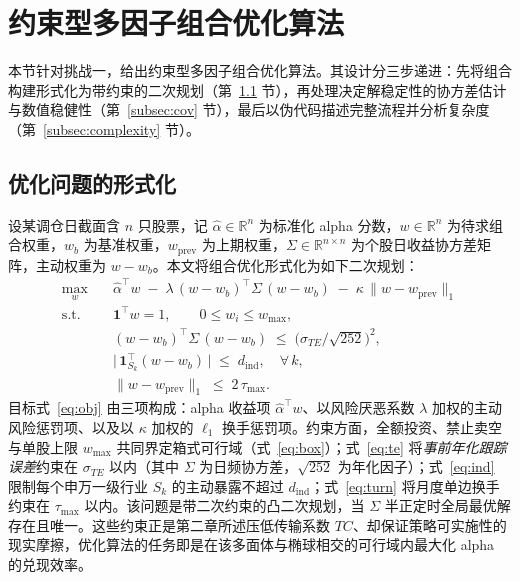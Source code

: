 \section{约束型多因子组合优化算法}
\label{sec:cpo}

本节针对挑战一，给出约束型多因子组合优化算法。其设计分三步递进：先将组合构建形式化为带约束的二次规划（第~\ref{subsec:formulation} 节），再处理决定解稳定性的协方差估计与数值稳健性（第~\ref{subsec:cov} 节），最后以伪代码描述完整流程并分析复杂度（第~\ref{subsec:complexity} 节）。

\subsection{优化问题的形式化}
\label{subsec:formulation}
设某调仓日截面含 $n$ 只股票，记 $\hat\alpha\in\mathbb{R}^n$ 为标准化 alpha 分数，$w\in\mathbb{R}^n$ 为待求组合权重，$w_b$ 为基准权重，$w_{\text{prev}}$ 为上期权重，$\Sigma\in\mathbb{R}^{n\times n}$ 为个股日收益协方差矩阵，主动权重为 $w-w_b$。本文将组合优化形式化为如下二次规划：
\begin{align}
\max_{w}\quad & \hat\alpha^\top w \;-\; \lambda\,(w-w_b)^\top \Sigma\,(w-w_b)\;-\;\kappa\,\lVert w-w_{\text{prev}}\rVert_1 \label{eq:obj}\\
\text{s.t.}\quad & \mathbf{1}^\top w = 1,\qquad 0 \le w_i \le w_{\max}, \label{eq:box}\\
& (w-w_b)^\top \Sigma\,(w-w_b) \;\le\; \big(\sigma_{TE}/\sqrt{252}\big)^2, \label{eq:te}\\
& \big|\,\mathbf{1}_{S_k}^\top (w-w_b)\,\big| \;\le\; d_{\text{ind}},\quad \forall\,k, \label{eq:ind}\\
& \lVert w-w_{\text{prev}}\rVert_1 \;\le\; 2\,\tau_{\max}. \label{eq:turn}
\end{align}
目标式~\eqref{eq:obj} 由三项构成：alpha 收益项 $\hat\alpha^\top w$、以风险厌恶系数 $\lambda$ 加权的主动风险惩罚项、以及以 $\kappa$ 加权的 $\ell_1$ 换手惩罚项。约束方面，全额投资、禁止卖空与单股上限 $w_{\max}$ 共同界定箱式可行域（式~\eqref{eq:box}）；式~\eqref{eq:te} 将\emph{事前年化跟踪误差}约束在 $\sigma_{TE}$ 以内（其中 $\Sigma$ 为日频协方差，$\sqrt{252}$ 为年化因子）；式~\eqref{eq:ind} 限制每个申万一级行业 $S_k$ 的主动暴露不超过 $d_{\text{ind}}$；式~\eqref{eq:turn} 将月度单边换手约束在 $\tau_{\max}$ 以内。该问题是带二次约束的凸二次规划，当 $\Sigma$ 半正定时全局最优解存在且唯一。这些约束正是第二章所述压低传输系数 $TC$、却保证策略可实施性的现实摩擦，优化算法的任务即是在该多面体与椭球相交的可行域内最大化 alpha 的兑现效率。


